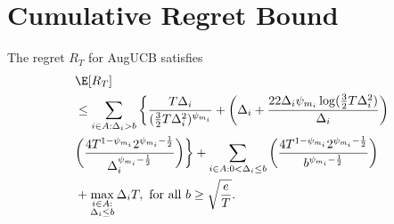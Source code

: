\section{Cumulative Regret Bound}

\begin{theorem}
\label{proofTheorem:Prop:1}
The regret $R_T$ for AugUCB satisfies
\begin{align*}
&\E [R_{T}]\\
& \leq \sum\limits_{i\in A:\Delta_{i} > b}\bigg\lbrace \dfrac{T\Delta_{i}}{( \frac{3}{2} T\Delta_i^{2})^{\psi_{m_i}}}
  + \left( \Delta_i +\dfrac{22\Delta_i\psi_{m_i}\log( \frac{3}{2} T\Delta_i^2)}{ \Delta_i}\right)\\
  & \bigg(\dfrac{4T^{1-\psi_{m_i}}2^{\psi_{m_i}-\frac{1}{2}}}{\Delta_{i}^{\psi_{m_i}-\frac{1}{2}}} \bigg)\bigg \rbrace +\sum_{i\in A: 0 < \Delta_{i} \leq b}\bigg(\dfrac{4T^{1-\psi_{m_i}}2^{\psi_{m_i}-\frac{1}{2}}}{b^{\psi_{m_i}-\frac{1}{2}}} \bigg) \\
  & + \max_{\substack{i\in A: \\ \Delta_{i}\leq b}}\Delta_{i}T, \text{  for all $b\geq\sqrt{\frac{e}{T}}$}. 
\end{align*} 
\end{theorem}


